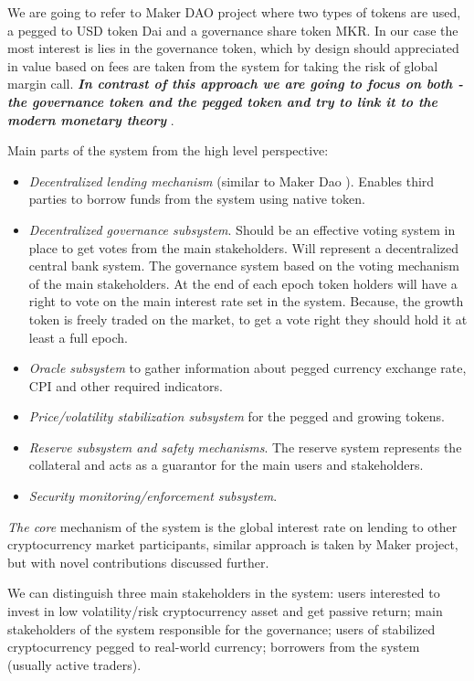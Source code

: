 \documentclass[12pt, a4paper, twocolumn]{article}
\begin{document}
We are going to refer to Maker DAO project \cite{dai} where two types of tokens are used, a pegged to USD token Dai and a governance share token MKR. In our case the most interest is lies in the governance token, which by design should appreciated in value based on fees are taken from the system for taking the risk of global margin call. \textit{\textbf{In contrast of this approach we are going to focus on both - the governance token and the pegged token and try to link it to the modern monetary theory}} \cite{randallwray2012}. 

Main parts of the system from the high level perspective:

\begin{itemize}
\item \textit{Decentralized lending mechanism} (similar to Maker Dao \citep{dai}). Enables third parties to borrow funds from the system using native token.
\item \textit{Decentralized governance subsystem}. Should be an effective voting system in place to get votes  from the main stakeholders. Will represent a decentralized central bank system.
The governance system based on the voting mechanism of the main stakeholders. At the end of each epoch token holders will have a right to vote on the main interest rate set in the system. Because,  the growth token is freely traded on the market, to get a vote right they should hold it at least a full epoch. 
\item \textit{Oracle subsystem} to gather information about pegged currency exchange rate, CPI and other required indicators.
\item \textit{Price/volatility stabilization subsystem} for the pegged and growing tokens.
\item \textit{Reserve subsystem and safety mechanisms}.
The reserve system represents the collateral and acts as a guarantor for the main users and stakeholders. 
\item \textit{Security monitoring/enforcement subsystem}.
\end{itemize}
 
\textit{The core} mechanism of the system is the global interest rate on lending to other cryptocurrency market participants, similar approach is taken by Maker project, but with novel contributions discussed further.

We can distinguish three main stakeholders in the system: users interested to invest in low volatility/risk cryptocurrency asset and get passive return; main stakeholders of the system responsible for the governance; users of stabilized cryptocurrency pegged to real-world currency; borrowers from the system (usually active traders).
\end{document}
